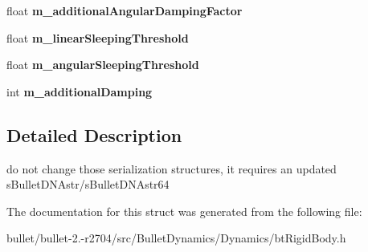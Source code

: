 \begin{DoxyCompactItemize}
\item 
\hypertarget{structbt_rigid_body_float_data_a8964f30a5e6fe9692e49eebb59eb32ee}{float {\bfseries m\+\_\+additional\+Angular\+Damping\+Factor}}\label{structbt_rigid_body_float_data_a8964f30a5e6fe9692e49eebb59eb32ee}

\item 
\hypertarget{structbt_rigid_body_float_data_aecdcb04a46d8462c05375e353c0f71ea}{float {\bfseries m\+\_\+linear\+Sleeping\+Threshold}}\label{structbt_rigid_body_float_data_aecdcb04a46d8462c05375e353c0f71ea}

\item 
\hypertarget{structbt_rigid_body_float_data_aaf43c3a1dbe610032ddc21b9a968800c}{float {\bfseries m\+\_\+angular\+Sleeping\+Threshold}}\label{structbt_rigid_body_float_data_aaf43c3a1dbe610032ddc21b9a968800c}

\item 
\hypertarget{structbt_rigid_body_float_data_afafbf4150a2f6ee7832b523f65aa0de2}{int {\bfseries m\+\_\+additional\+Damping}}\label{structbt_rigid_body_float_data_afafbf4150a2f6ee7832b523f65aa0de2}

\end{DoxyCompactItemize}


\subsection{Detailed Description}
do not change those serialization structures, it requires an updated s\+Bullet\+D\+N\+Astr/s\+Bullet\+D\+N\+Astr64 

The documentation for this struct was generated from the following file\+:\begin{DoxyCompactItemize}
\item 
bullet/bullet-\/2.-\/r2704/src/\+Bullet\+Dynamics/\+Dynamics/bt\+Rigid\+Body.\+h\end{DoxyCompactItemize}
